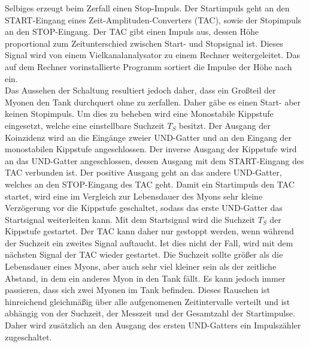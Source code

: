 Selbiges erzeugt beim Zerfall einen Stop-Impuls.
Der Startimpuls geht an den START-Eingang eines Zeit-Amplituden-Converters (TAC), sowie der Stopimpuls an den STOP-Eingang.
Der TAC gibt einen Impuls aus, dessen Höhe proportional zum Zeitunterschied zwischen Start- und Stopsignal ist.
Dieses Signal wird von einem Vielkanalanalysator zu einem Rechner weitergeleitet.
Das auf dem Rechner vorinstallierte Programm sortiert die Impulse der Höhe nach ein.\\
Das Aussehen der Schaltung resultiert jedoch daher, dass ein Großteil der Myonen den Tank durchquert ohne zu zerfallen.
Daher gäbe es einen Start- aber keinen Stopimpuls.
Um dies zu beheben wird eine Monostabile Kippstufe eingesetzt, welche eine einstellbare Suchzeit $T_S$ besitzt.
Der Ausgang der Koinzidenz wird an die Eingänge zweier UND-Gatter und an den Eingang der monostabilen Kippstufe angeschlossen.
Der inverse Ausgang der Kippstufe wird an das UND-Gatter angeschlossen, dessen Ausgang mit dem START-Eingang des TAC verbunden ist.
Der positive Ausgang geht an das andere UND-Gatter, welches an den STOP-Eingang des TAC geht.
Damit ein Startimpuls den TAC startet, wird eine im Vergleich zur Lebensdauer des Myons sehr kleine Verzögerung vor die Kippstufe geschaltet, sodass das erste UND-Gatter das Startsignal weiterleiten kann.
Mit dem Startsignal wird die Suchzeit $T_S$ der Kippstufe gestartet.
Der TAC kann daher nur gestoppt werden, wenn während der Suchzeit ein zweites Signal auftaucht.
Ist dies nicht der Fall, wird mit dem nächsten Signal der TAC wieder gestartet.
Die Suchzeit sollte größer als die Lebensdauer eines Myons, aber auch sehr viel kleiner sein als der zeitliche Abstand, in dem ein anderes Myon in den Tank fällt.
Es kann jedoch immer passieren, dass sich zwei Myonen im Tank befinden.
Dieses Rauschen ist hinreichend gleichmäßig über alle aufgenomenen Zeitintervalle verteilt und ist abhängig von der Suchzeit, der Messzeit und der Gesamtzahl der Startimpulse.
Daher wird zusätzlich an den Ausgang des ersten UND-Gatters ein Impulszähler zugeschaltet.
